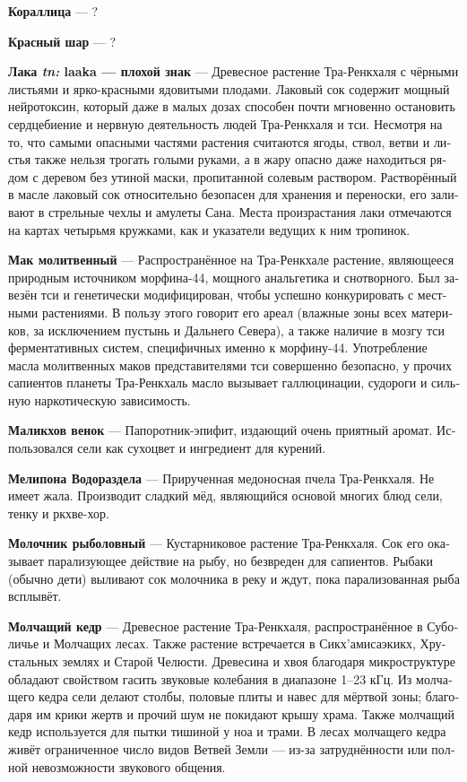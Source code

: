 \documentclass[a4paper,12pt,fleqn]{book}\usepackage{cooltooltips}\usepackage{polyglossia}\setdefaultlanguage[babelshorthands=true]{russian}\setotherlanguage{english}\defaultfontfeatures{Ligatures=TeX,Mapping=tex-text} \usepackage{xcolor}\definecolor{lightgray}{HTML}{bbbbbb}\color{lightgray}\newcommand{\ml}[3]{\textenglish{\textcolor{black}{#3}}}
\newcommand{\theterm}[3]{\textbf{\hypertarget{#1}{#2}} --- #3}
\newcommand{\theorigin}[3]{\textit{#1:} #2 --- #3}
\begin{document}
\theterm{coraldrake}
{Кораллица}
{?}

\theterm{redball}
{Красный шар}
{?}

\theterm{laaka} %
{Лака \theorigin{tn}{laaka}{плохой знак}}
{Древесное растение Тра-Ренкхаля с чёрными листьями и ярко-красными ядовитыми плодами.
Лаковый сок содержит мощный нейротоксин, который даже в малых дозах способен почти мгновенно остановить сердцебиение и нервную деятельность людей Тра-Ренкхаля и тси.
Несмотря на то, что самыми опасными частями растения считаются ягоды, ствол, ветви и листья также нельзя трогать голыми руками, а в жару опасно даже находиться рядом с деревом без утиной маски, пропитанной солевым раствором.
Растворённый в масле лаковый сок относительно безопасен для хранения и переноски, его заливают в стрельные чехлы и амулеты Сана.
Места произрастания лаки отмечаются на картах четырьмя кружками, как и указатели ведущих к ним тропинок.}

\theterm{praypoppy}
{Мак молитвенный}
{Распространённое на Тра-Ренкхале растение, являющееся природным источником морфина-44, мощного анальгетика и снотворного.
Был завезён тси и генетически модифицирован, чтобы успешно конкурировать с местными растениями.
В пользу этого говорит его ареал (влажные зоны всех материков, за исключением пустынь и Дальнего Севера), а также наличие в мозгу тси ферментативных систем, специфичных именно к морфину-44.
Употребление масла молитвенных маков представителями тси совершенно безопасно, у прочих сапиентов планеты Тра-Ренкхаль масло вызывает галлюцинации, судороги и сильную наркотическую зависимость.}

\theterm{wreath-of-malikch}
{Маликхов венок}
{Папоротник-эпифит, издающий очень приятный аромат.
Использовался сели как сухоцвет и ингредиент для курений.}

\theterm{melipona}
{Мелипона Водораздела}
{Прирученная медоносная пчела Тра-Ренкхаля.
Не имеет жала.
Производит сладкий мёд, являющийся основой многих блюд сели, тенку и ркхве-хор.}

\theterm{milkbush-of-fisher}
{Молочник рыболовный}
{Кустарниковое растение Тра-Ренкхаля.
Сок его оказывает парализующее действие на рыбу, но безвреден для сапиентов.
Рыбаки (обычно дети) выливают сок молочника в реку и ждут, пока парализованная рыба всплывёт.}

\theterm{silent-cedar} %
{Молчащий кедр}
{Древесное растение Тра-Ренкхаля, распространённое в Суболичье и Молчащих лесах.
Также растение встречается в Сикх'амисаэкикх, Хрустальных землях и Старой Челюсти.
Древесина и хвоя благодаря микроструктуре обладают свойством гасить звуковые колебания в диапазоне 1--23 кГц.
Из молчащего кедра сели делают столбы, половые плиты и навес для мёртвой зоны;
благодаря им крики жертв и прочий шум не покидают крышу храма.
Также молчащий кедр используется для пытки тишиной у ноа и трами.
В лесах молчащего кедра живёт ограниченное число видов Ветвей Земли --- из-за затруднённости или полной невозможности звукового общения.}
\end{document}
